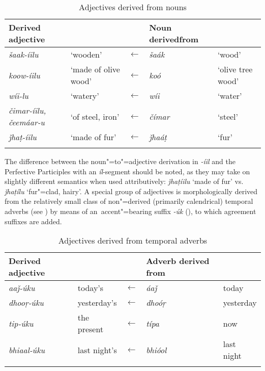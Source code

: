 \begin{table}[ht]
\caption{Adjectives derived from nouns}
\begin{tabularx}{\textwidth}{ Q l l P{22mm} l }
\lsptoprule
Derived adjective &
&
&
Noun derived\newline from &
\\\hline
\textit{šaak-íilu} &
`wooden' &
$\leftarrow$ &
\textit{šaák} &
`wood'\\
\textit{koow-íilu} &
`made of olive wood' &
$\leftarrow$ &
\textit{koó} &
`olive tree wood'\\
\textit{wíi-lu} &
`watery' &
$\leftarrow$ &
\textit{wíi} &
`water'\\
\textit{čimar-íilu, čeemáar-u} &
`of steel, iron' &
$\leftarrow$ &
\textit{čímar} &
`steel'\\
\textit{ǰhaṭ-íilu} &
`made of fur' &
$\leftarrow$ &
\textit{ǰhaáṭ} &
`fur'\\\lspbottomrule
\end{tabularx}
\label{tab:6-5}
\end{table}


The difference between the noun"=to"=adjective derivation in \textit{-íil} and the Perfective Participles with an \textit{íl}-segment should be noted, as they may take on slightly different semantics when used attributively: \textit{ǰhaṭíilu} `made of fur' vs. \textit{ǰhaṭílu} `fur"=clad, hairy'. A special group of adjectives is morphologically derived from the relatively small class of non"=derived (primarily calendrical) temporal adverbs (see ) by means of an~accent"=bearing suffix \textit{-úk} (), to which agreement suffixes are added.


\begin{table}[ht]
\caption{Adjectives derived from temporal adverbs}

\begin{tabularx}{\textwidth}{ Q l l Q l }
\lsptoprule
Derived adjective &
&
&
Adverb derived from &
\\\hline
\textit{aaǰ-úku} &
today's &
$\leftarrow$ &
\textit{áaǰ} &
today\\
\textit{dhooṛ-úku} &
yesterday's &
$\leftarrow$ &
\textit{dhoóṛ} &
yesterday\\
\textit{tip-úku} &
the present &
$\leftarrow$ &
\textit{típa} &
now\\
\textit{bhiaal-úku} &
last night's &
$\leftarrow$ &
\textit{bhióol} &
last night\\\lspbottomrule
\end{tabularx}
\label{tab:6-6}
\end{table}


